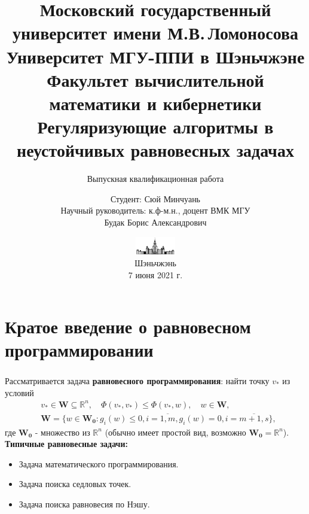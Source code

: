 \documentclass[unicode, t, 11pt]{beamer}%
\title{
	{
	\footnotesize\color{black}Московский государственный университет имени М.В.\,Ломоносова\\
	Университет МГУ-ППИ в Шэньчжэне\\
    Факультет вычислительной математики и кибернетики\\}
    \vspace{\baselineskip}
    {\LARGE Регуляризующие алгоритмы в неустойчивых равновесных задачах}
}
\subtitle{Выпускная квалификационная работа}
\author{\footnotesize Студент: Сюй Минчуань\\
		Научный руководитель: к.ф-м.н., доцент ВМК МГУ\\
		Будак Борис Александрович}
\date{\includegraphics[height=0.8cm]{./images/MSU}\\
	  \scriptsize
	  Шэньчжэнь\\
	  7 июня 2021 г.}
\begin{document}
	\frame[plain]{\titlepage}  %
	\section{Кратое введение о равновесном программировании}
		\begin{frame}
			\frametitle{\insertsection}
			Рассматривается задача \textbf{равновесного программирования}: найти точку $v_*$ из условий 
			\begin{equation}\label{1}
			\begin{aligned}
			&v_*\in \mathbf{W}\subseteq \mathbb{R}^n,\quad \Phi(v_*,v_*)\leqslant\Phi(v_*,w),\quad w\in \mathbf{W},\\
			&\mathbf{W}=\{w\in \mathbf{W_0}:g_i(w)\leqslant 0,i=\overline{1,m},g_i(w)=0,i=\overline{m+1,s} \},
			\end{aligned}
			\end{equation}
			где $\mathbf{W_0}$ - множество из $\mathbb{R}^n$ (обычно имеет простой вид, возможно $\mathbf{W_{0}}=\mathbb{R}^n$).\\[5mm]
			\textbf{Типичные равновесные задачи:}
			\begin{itemize}
				\item Задача математического программирования.
				\item Задача поиска седловых точек.
				\item Задача поиска равновесия по Нэшу.
			\end{itemize}
		\end{frame}
\end{document}
